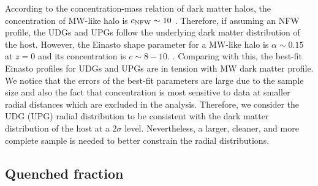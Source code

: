 \documentclass[twocolumn,astrosymb,twocolappendix]{aastex631}
\begin{document}
\begin{CJK*}{UTF8}{gbsn}
According to the concentration-mass relation of dark matter halos, the concentration of MW-like halo is $c_{\rm NFW} \sim 10$ \citep[e.g.,][]{Bullock2001,Duffy2008,Dutton2014,Diemer2019}. Therefore, if assuming an NFW profile, the UDGs and UPGs follow the underlying dark matter distribution of the host. However, the Einasto shape parameter for a MW-like halo is $\alpha\sim 0.15$ at $z=0$ and its concentration is $c\sim 8-10$. \citep{Gao2008,Dutton2014}. Comparing with this, the best-fit Einasto profiles for UDGs and UPGs are in tension with MW dark matter profile. We notice that the errors of the best-fit parameters are large due to the sample size and also the fact that concentration is most sensitive to data at smaller radial distances which are excluded in the analysis. Therefore, we consider the UDG (UPG) radial distribution to be consistent with the dark matter distribution of the host at a $2\sigma$ level. Nevertheless, a larger, cleaner, and more complete sample is needed to better constrain the radial distributions. 


\subsection{Quenched fraction}\label{sec:quench}


\end{CJK*}
\end{document}
